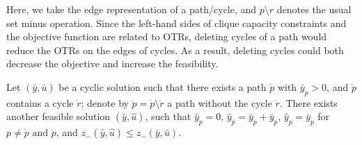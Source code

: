 Here, we take the edge representation of a path/cycle, and \(p \setminus r\) denotes the usual set minus operation.
Since the left-hand sides of clique capacity constraints and the objective function are related to OTRs, deleting cycles of a path would reduce the OTRs on the edges of cycles. As a result, deleting cycles could both decrease the objective and increase the feasibility.   
\begin{lemma}\label{lem:acycle}
Let \((\bar{y}, \bar{u})\) be a cyclic solution such that there exists a path \(\dot{p}\) with \(\bar{y}_{\dot{p}}> 0\), and \(\dot{p}\) contains a cycle \(\dot{r}\); denote by \(\ddot{p} = \dot{p} \setminus \dot{r}\) a path without the cycle \(\dot{r}\). There exists another feasible solution \((\widehat{y},\widehat{u})\), such that \(\widehat{y}_{\dot{p}} = 0 \), \(\widehat{y}_{\ddot{p}} = \bar{y}_{\dot{p}} + \bar{y}_{\ddot{p}}\),  \(\widehat{y}_{p} = \bar{y}_{p}\) for \(p \ne \dot{p} \text{ and } \ddot{p}\),  and \(z_{-}(\widehat{y}, \widehat{u}) \le z_{-}(\bar{y}, \bar{u})\).
\end{lemma}
